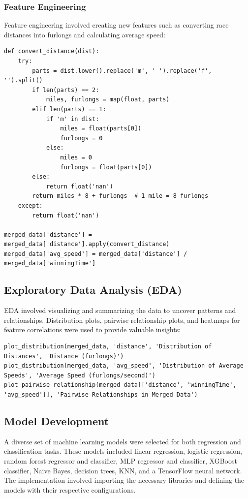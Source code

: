\documentclass{article}
\begin{document}
\subsubsection*{Feature Engineering}
Feature engineering involved creating new features such as converting race distances into furlongs and calculating average speed:
\begin{verbatim}
def convert_distance(dist):
    try:
        parts = dist.lower().replace('m', ' ').replace('f', '').split()
        if len(parts) == 2:
            miles, furlongs = map(float, parts)
        elif len(parts) == 1:
            if 'm' in dist:
                miles = float(parts[0])
                furlongs = 0
            else:
                miles = 0
                furlongs = float(parts[0])
        else:
            return float('nan')
        return miles * 8 + furlongs  # 1 mile = 8 furlongs
    except:
        return float('nan')

merged_data['distance'] = merged_data['distance'].apply(convert_distance)
merged_data['avg_speed'] = merged_data['distance'] / merged_data['winningTime']
\end{verbatim}

\subsection*{Exploratory Data Analysis (EDA)}
EDA involved visualizing and summarizing the data to uncover patterns and relationships. Distribution plots, pairwise relationship plots, and heatmaps for feature correlations were used to provide valuable insights:
\begin{verbatim}
plot_distribution(merged_data, 'distance', 'Distribution of Distances', 'Distance (furlongs)')
plot_distribution(merged_data, 'avg_speed', 'Distribution of Average Speeds', 'Average Speed (furlongs/second)')
plot_pairwise_relationship(merged_data[['distance', 'winningTime', 'avg_speed']], 'Pairwise Relationships in Merged Data')
\end{verbatim}

\subsection*{Model Development}
A diverse set of machine learning models were selected for both regression and classification tasks. These models included linear regression, logistic regression, random forest regressor and classifier, MLP regressor and classifier, XGBoost classifier, Naive Bayes, decision trees, KNN, and a TensorFlow neural network. The implementation involved importing the necessary libraries and defining the models with their respective configurations.
\end{document}
